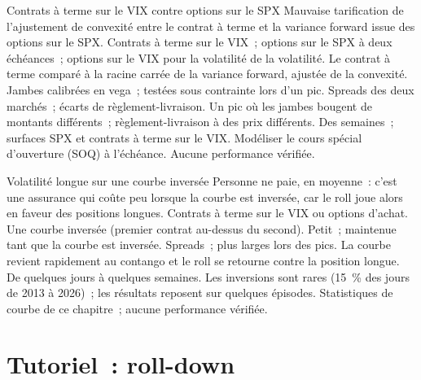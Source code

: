 \begin{strategyfile}{Contrats à terme sur le VIX contre options sur le SPX}\label{strat:s2:the-volatility-index-complex:options}
 Mauvaise tarification de l'ajustement de convexité entre le contrat à terme et la variance forward issue des options sur le SPX.
 Contrats à terme sur le VIX~; options sur le SPX à deux échéances~; options sur le VIX pour la volatilité de la volatilité.
 Le contrat à terme comparé à la racine carrée de la variance forward, ajustée de la convexité.
 Jambes calibrées en vega~; testées sous contrainte lors d'un pic.
 Spreads des deux marchés~; écarts de règlement-livraison.
 Un pic où les jambes bougent de montants différents~; règlement-livraison à des prix différents.
 Des semaines~; surfaces SPX et contrats à terme sur le VIX.
 Modéliser le cours spécial d'ouverture (SOQ) à l'échéance.
 Aucune performance vérifiée.
\end{strategyfile}

\begin{strategyfile}{Volatilité longue sur une courbe inversée}\label{strat:s2:the-volatility-index-complex:inverted}
 Personne ne paie, en moyenne~: c'est une assurance qui coûte peu lorsque la courbe est inversée, car le roll joue alors en
faveur des positions longues.
 Contrats à terme sur le VIX ou options d'achat.
 Une courbe inversée (premier contrat au-dessus du second).
 Petit~; maintenue tant que la courbe est inversée.
 Spreads~; plus larges lors des pics.
 La courbe revient rapidement au contango et le roll se retourne contre la position longue.
 De quelques jours à quelques semaines.
 Les inversions sont rares (15~\% des jours de 2013 à 2026)~; les résultats reposent sur quelques épisodes.
 Statistiques de courbe de ce chapitre~; aucune performance vérifiée.
\end{strategyfile}

\section{Tutoriel~: roll-down}\label{tut:s2:the-volatility-index-complex:tut}

